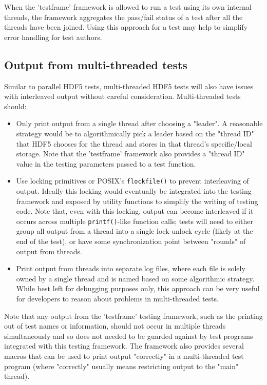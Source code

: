 \documentclass[../HDF5_RFC.tex]{subfiles}
\begin{document}
When the 'testframe' framework is allowed to run a test using its own internal threads, the framework
aggregates the pass/fail status of a test after all the threads have been joined. Using this approach
for a test may help to simplify error handling for test authors.

\subsection{Output from multi-threaded tests}

Similar to parallel HDF5 tests, multi-threaded HDF5 tests will also have issues with interleaved output
without careful consideration. Multi-threaded tests should:

\begin{itemize}

    \item Only print output from a single thread after choosing a "leader". A reasonable strategy would be
          to algorithmically pick a leader based on the "thread ID" that HDF5 chooses for the thread and
          stores in that thread's specific/local storage. Note that the 'testframe' framework also provides
          a "thread ID" value in the testing parameters passed to a test function.
    \item Use locking primitives or POSIX's \texttt{flockfile()} to prevent interleaving of output. Ideally
          this locking would eventually be integrated into the testing framework and exposed by utility functions to simplify the writing of testing code. Note that, even with this locking, output can become interleaved if it occurs across multiple \texttt{printf()}-like function calls; tests will need to either group all output from a thread into a single lock-unlock cycle (likely at the end
          of the test), or have some synchronization point between "rounds" of output from threads.
    \item Print output from threads into separate log files, where each file is solely owned by a single
          thread and is named based on some algorithmic strategy. While best left for debugging purposes
          only, this approach can be very useful for developers to reason about problems in multi-threaded tests.

\end{itemize}

Note that any output from the 'testframe' testing framework, such as the printing out of test names or information, should not occur in multiple threads simultaneously and so does not needed to be guarded
against by test programs integrated with this testing framework. The framework also provides several
macros that can be used to print output "correctly" in a multi-threaded test program (where "correctly"
usually means restricting output to the "main" thread).
\end{document}
